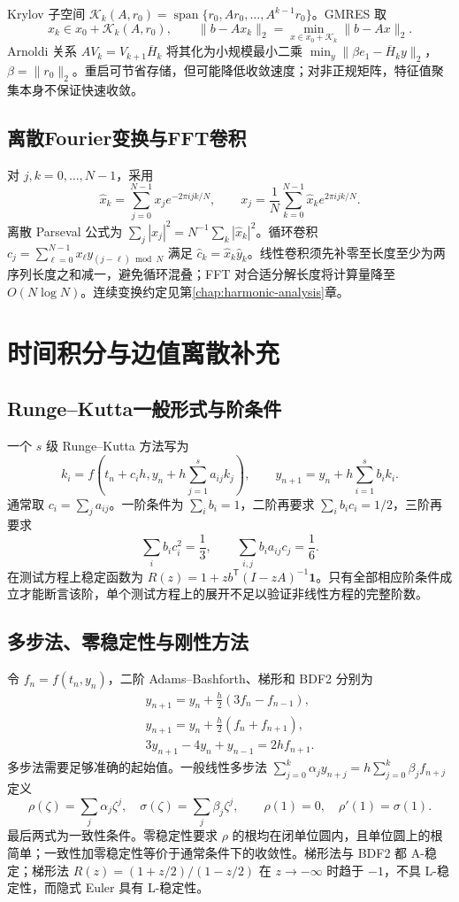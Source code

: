 \documentclass[../main.tex]{subfiles}
\begin{document}
Krylov 子空间 $\mathcal K_k(A,r_0)=\operatorname{span}\{r_0,Ar_0,\ldots,A^{k-1}r_0\}$。GMRES 取
\[
x_k\in x_0+\mathcal K_k(A,r_0),\qquad
\|b-Ax_k\|_2=\min_{x\in x_0+\mathcal K_k}\|b-Ax\|_2.
\]
Arnoldi 关系 $AV_k=V_{k+1}\overline H_k$ 将其化为小规模最小二乘 $\min_y\|\beta e_1-\overline H_ky\|_2$，$\beta=\|r_0\|_2$。重启可节省存储，但可能降低收敛速度；对非正规矩阵，特征值聚集本身不保证快速收敛。

\subsection{离散Fourier变换与FFT卷积}
对 $j,k=0,\ldots,N-1$，采用
\[
\widehat x_k=\sum_{j=0}^{N-1}x_je^{-2\pi ijk/N},\qquad
x_j=\frac1N\sum_{k=0}^{N-1}\widehat x_ke^{2\pi ijk/N}.
\]
离散 Parseval 公式为 $\sum_j|x_j|^2=N^{-1}\sum_k|\widehat x_k|^2$。循环卷积 $c_j=\sum_{\ell=0}^{N-1}x_\ell y_{(j-\ell)\bmod N}$ 满足 $\widehat c_k=\widehat x_k\widehat y_k$。线性卷积须先补零至长度至少为两序列长度之和减一，避免循环混叠；FFT 对合适分解长度将计算量降至 $O(N\log N)$。连续变换约定见第\ref{chap:harmonic-analysis}章。

\section{时间积分与边值离散补充}
\subsection{Runge--Kutta一般形式与阶条件}
一个 $s$ 级 Runge--Kutta 方法写为
\[
k_i=f\!\left(t_n+c_ih,y_n+h\sum_{j=1}^sa_{ij}k_j\right),\qquad
y_{n+1}=y_n+h\sum_{i=1}^sb_ik_i.
\]
通常取 $c_i=\sum_j a_{ij}$。一阶条件为 $\sum_i b_i=1$，二阶再要求 $\sum_i b_ic_i=1/2$，三阶再要求
\[
\sum_i b_ic_i^2=\frac13,\qquad\sum_{i,j}b_ia_{ij}c_j=\frac16.
\]
在测试方程上稳定函数为 $R(z)=1+z b^{\mathsf T}(I-zA)^{-1}\bm1$。只有全部相应阶条件成立才能断言该阶，单个测试方程上的展开不足以验证非线性方程的完整阶数。

\subsection{多步法、零稳定性与刚性方法}
令 $f_n=f(t_n,y_n)$，二阶 Adams--Bashforth、梯形和 BDF2 分别为
\begin{gather*}
y_{n+1}=y_n+\tfrac h2(3f_n-f_{n-1}),\\
y_{n+1}=y_n+\tfrac h2(f_n+f_{n+1}),\\
3y_{n+1}-4y_n+y_{n-1}=2h f_{n+1}.
\end{gather*}
多步法需要足够准确的起始值。一般线性多步法 $\sum_{j=0}^k\alpha_j y_{n+j}=h\sum_{j=0}^k\beta_jf_{n+j}$ 定义
\[
\rho(\zeta)=\sum_j\alpha_j\zeta^j,\quad\sigma(\zeta)=\sum_j\beta_j\zeta^j,
\qquad \rho(1)=0,\quad\rho'(1)=\sigma(1).
\]
最后两式为一致性条件。零稳定性要求 $\rho$ 的根均在闭单位圆内，且单位圆上的根简单；一致性加零稳定性等价于通常条件下的收敛性。梯形法与 BDF2 都 A-稳定；梯形法 $R(z)=(1+z/2)/(1-z/2)$ 在 $z\to-\infty$ 时趋于 $-1$，不具 L-稳定性，而隐式 Euler 具有 L-稳定性。
\end{document}
